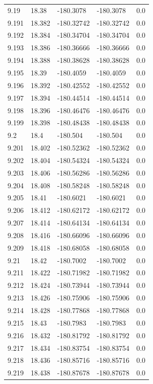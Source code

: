 \begin{tabular}{lllll}
9.19 & 18.38 & -180.3078 & -180.3078 & 0.0 \\
9.191 & 18.382 & -180.32742 & -180.32742 & 0.0 \\
9.192 & 18.384 & -180.34704 & -180.34704 & 0.0 \\
9.193 & 18.386 & -180.36666 & -180.36666 & 0.0 \\
9.194 & 18.388 & -180.38628 & -180.38628 & 0.0 \\
9.195 & 18.39 & -180.4059 & -180.4059 & 0.0 \\
9.196 & 18.392 & -180.42552 & -180.42552 & 0.0 \\
9.197 & 18.394 & -180.44514 & -180.44514 & 0.0 \\
9.198 & 18.396 & -180.46476 & -180.46476 & 0.0 \\
9.199 & 18.398 & -180.48438 & -180.48438 & 0.0 \\
9.2 & 18.4 & -180.504 & -180.504 & 0.0 \\
9.201 & 18.402 & -180.52362 & -180.52362 & 0.0 \\
9.202 & 18.404 & -180.54324 & -180.54324 & 0.0 \\
9.203 & 18.406 & -180.56286 & -180.56286 & 0.0 \\
9.204 & 18.408 & -180.58248 & -180.58248 & 0.0 \\
9.205 & 18.41 & -180.6021 & -180.6021 & 0.0 \\
9.206 & 18.412 & -180.62172 & -180.62172 & 0.0 \\
9.207 & 18.414 & -180.64134 & -180.64134 & 0.0 \\
9.208 & 18.416 & -180.66096 & -180.66096 & 0.0 \\
9.209 & 18.418 & -180.68058 & -180.68058 & 0.0 \\
9.21 & 18.42 & -180.7002 & -180.7002 & 0.0 \\
9.211 & 18.422 & -180.71982 & -180.71982 & 0.0 \\
9.212 & 18.424 & -180.73944 & -180.73944 & 0.0 \\
9.213 & 18.426 & -180.75906 & -180.75906 & 0.0 \\
9.214 & 18.428 & -180.77868 & -180.77868 & 0.0 \\
9.215 & 18.43 & -180.7983 & -180.7983 & 0.0 \\
9.216 & 18.432 & -180.81792 & -180.81792 & 0.0 \\
9.217 & 18.434 & -180.83754 & -180.83754 & 0.0 \\
9.218 & 18.436 & -180.85716 & -180.85716 & 0.0 \\
9.219 & 18.438 & -180.87678 & -180.87678 & 0.0 \\

\end{tabular}
